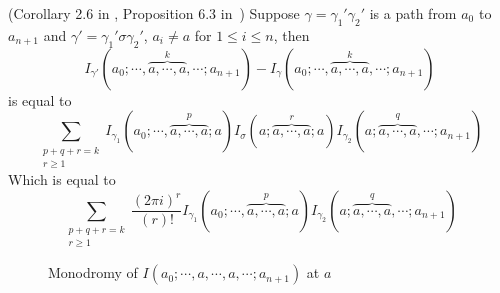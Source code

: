 \begin{lemma}\label{lem: monodromy of Iterated integrals}(Corollary 2.6 in \cite{Goncharov_MultiplePolylogarithmsAndMixedTateMotives}, Proposition 6.3 in~\cite{FrancisBrown_SingleValuedHyperlogarithmsAndUnipotentDifferentialEquations})
Suppose $\gamma=\gamma_1'\gamma_2'$ is a path from $a_0$ to $a_{n+1}$ and $\gamma'=\gamma_1'\sigma\gamma_2'$, $a_i\neq a$ for $1\leq i\leq n$, then
\begin{equation}\label{Equation for monodromy}
I_{\gamma'}(a_0;\cdots,\overbrace{a,\cdots,a}^k,\cdots;a_{n+1})-I_{\gamma}(a_0;\cdots,\overbrace{a,\cdots,a}^k,\cdots;a_{n+1})
\end{equation}
is equal to
\begin{equation}\label{Equation for monodromy2}
\sum_{\substack{p+q+r=k\\r\geq1}}I_{\gamma_1}(a_0;\cdots,\overbrace{a,\cdots,a}^p;a)I_{\sigma}(a;\overbrace{a,\cdots,a}^r;a)I_{\gamma_2}(a;\overbrace{a,\cdots,a}^q,\cdots;a_{n+1})
\end{equation}
Which is equal to
\begin{equation}\label{eq: equation for monodromy}
\sum_{\substack{p+q+r=k\\r\geq1}}\frac{(2\pi i)^{r}}{(r)!}I_{\gamma_1}(a_0;\cdots,\overbrace{a,\cdots,a}^p;a)I_{\gamma_2}(a;\overbrace{a,\cdots,a}^q,\cdots;a_{n+1})
\end{equation}
\begin{figure}[H]
\centering
{}
\caption{Monodromy of $I(a_0;\cdots,a,\cdots,a,\cdots;a_{n+1})$ at $a$}
\label{fig: monodromies of iterated integrals}
\end{figure}
\end{lemma}

